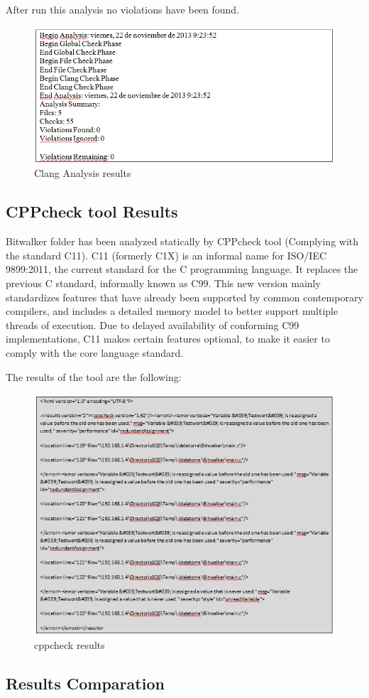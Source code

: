 After run this analysis no violations have been found.

\begin{figure}[H]
\centering
\includegraphics[scale=0.8]{./figures/clang.png}
\caption{Clang Analysis results}
\end{figure}

\subsection{CPPcheck tool Results}

Bitwalker folder has been analyzed statically by CPPcheck tool (Complying with the standard C11).
 C11 (formerly C1X) is an informal name for ISO/IEC 9899:2011, the current standard for the C programming language. It replaces the previous C standard, informally known as C99. This new version mainly standardizes features that have already been supported by common contemporary compilers, and includes a detailed memory model to better support multiple threads of execution. Due to delayed availability of conforming C99 implementations, C11 makes certain features optional, to make it easier to comply with the core language standard.
 
The results of the tool are the following:
\begin{figure}[H]
\centering
\includegraphics{./figures/cppcheck.png}
\caption{cppcheck results}
\end{figure}

\subsection{Results Comparation}
